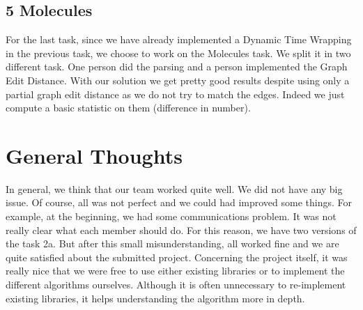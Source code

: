 \documentclass[12pt]{article}
\begin{document}
\subsection*{5 Molecules}
For the last task, since we have already implemented a Dynamic Time Wrapping in the previous task, we choose to work on the Molecules task. We split it in two different task. One person did the parsing and a person implemented the Graph Edit Distance.
With our solution we get pretty good results despite using only a partial graph edit distance as we do not try to match the edges.
Indeed we just compute a basic statistic on them (difference in number). 

\section*{General Thoughts}
In general, we think that our team worked quite well. We did not have any big issue. Of course, all was not perfect and we could had improved some things. For example, at the beginning, we had some communications problem. It was not really clear what each member should do. For this reason, we have two versions of the task 2a. But after this small misunderstanding, all worked fine and we are quite satisfied about the submitted project.
\newline Concerning the project itself, it was really nice that we were free to use either existing libraries or to implement the different algorithms ourselves. Although it is often unnecessary to re-implement existing libraries, it helps understanding the algorithm more in depth.
\end{document}
